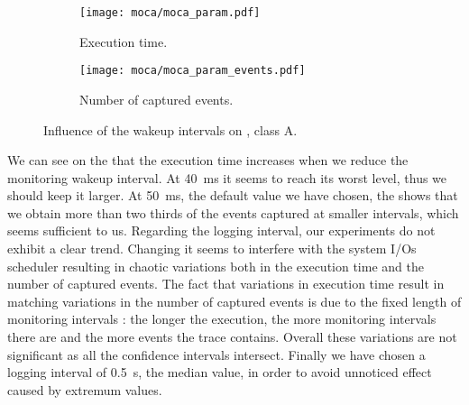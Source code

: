 \begin{figure}[htb]
    \centering
    \begin{subfigure}{.49\linewidth}
        \texttt{[image: moca/moca\_param.pdf]}
        \caption{Execution time.}
        \label{fig:param_time}
    \end{subfigure}
    \begin{subfigure}{.49\linewidth}
        \texttt{[image: moca/moca\_param\_events.pdf]}
        \caption{Number of captured events.}
        \label{fig:param_evts}
    \end{subfigure}
    \caption[Influence of Moca wakeup intervals.]{Influence of the wakeup intervals on \IS, class A.}
    \label{fig:param}
\end{figure}

We can see on the  that the execution time increases when we
reduce the monitoring wakeup interval. At \SI{40}{ms}
it seems to reach its worst level, thus we should keep it larger. At \SI{50}{ms}, the default value we have chosen, the
 shows that we obtain more than two thirds of the events captured
at smaller intervals, which seems sufficient to us.
Regarding the logging interval, our experiments do not exhibit a clear trend. Changing it seems to interfere with the system I/Os scheduler resulting in chaotic
variations both in the execution time and the number of captured events. The fact that variations in execution time result in matching variations in the number
of captured events is due to the fixed length of monitoring intervals : the longer the execution, the more monitoring intervals there are and the more events
the trace contains. Overall these variations are not significant as all the confidence intervals intersect. 
Finally we have chosen a logging interval of \SI{0.5}{s}, the median value, in order to avoid unnoticed effect caused by extremum values.

